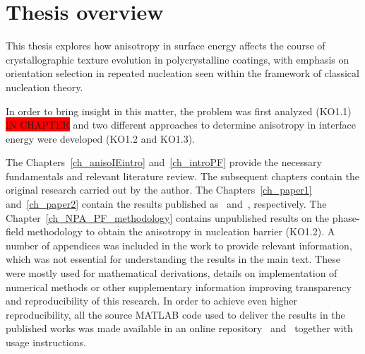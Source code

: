 


\section{Thesis overview}
This thesis explores how anisotropy in surface energy affects the course of crystallographic texture evolution in polycrystalline coatings, with emphasis on orientation selection in repeated nucleation seen within the framework of classical nucleation theory. 

In order to bring insight in this matter, the problem was first analyzed (KO1.1) \colorbox{red}{IN CHAPTER} and two different approaches to determine anisotropy in interface energy were developed (KO1.2 and KO1.3). 

The Chapters~\ref{ch_anisoIEintro} and~\ref{ch_introPF} provide the necessary fundamentals and relevant literature review. The subsequent chapters contain the original research carried out by the author. The Chapters~\ref{ch_paper1} and~\ref{ch_paper2} contain the results published as~\cite{Minar2022} and~\cite{Minar2024}, respectively. The Chapter~\ref{ch_NPA_PF_methodology} contains unpublished results on the phase-field methodology to obtain the anisotropy in nucleation barrier (KO1.2). A number of appendices was included in the work to provide relevant information, which was not essential for understanding the results in the main text. These were mostly used for mathematical derivations, details on implementation of numerical methods or other supplementary information improving transparency and reproducibility of this research. In order to achieve even higher reproducibility, all the source MATLAB code used to deliver the results in the published works was made available in an online repository~\cite{Minar2022dataset} and~\cite{Minar2023dataset} together with usage instructions.

